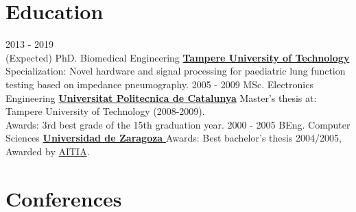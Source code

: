 \documentclass[letterpaper]{twentysecondcv} %
\begin{document}
\section{Education}



\begin{twenty} %
	\twentyitem
    	{2013 - 2019 \\ (Expected)}
        {PhD. Biomedical Engineering}
        {\href{https://www.tut.fi/}{\textbf{Tampere University of Technology}}}
        {}%
        {Specialization: Novel hardware and signal processing for paediatric lung function testing based on impedance pneumography.}
	\twentyitem
    	{2005 - 2009}
        {MSc. Electronics Engineering}
        {\href{https://www.upc.cat}{\textbf{Universitat Politecnica de Catalunya}}}
        {}%
        {Master's thesis at: Tampere University of Technology (2008-2009). \\
        Awards: 3rd best grade of the 15th graduation year.}
     \twentyitem
    	{2000 - 2005}
        {BEng. Computer Sciences }
        {\href{http://www.unizar.es/}{\textbf{Universidad de Zaragoza } }}
        {}%
        {Awards: Best bachelor's thesis 2004/2005, Awarded by \href{http://www.aitia.org/}{AITIA}.}
\end{twenty}



\section{Conferences }
\end{document}
